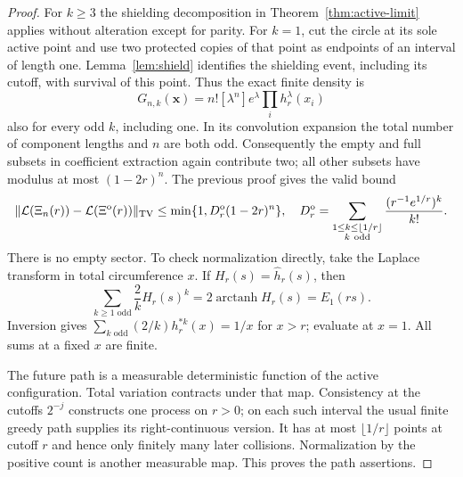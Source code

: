 \documentclass[11pt,letterpaper]{article}
\begin{document}
\begin{proof}
For $k\ge3$ the shielding decomposition in
Theorem~\ref{thm:active-limit} applies without alteration except for
parity. For $k=1$, cut the circle at its sole active point and use two
protected copies of that point as endpoints of an interval of length one.
Lemma~\ref{lem:shield} identifies the shielding event, including its
cutoff, with survival of this point. Thus the exact finite density is
\[
 G_{n,k}(\mathbf x)=n![\lambda^n]e^\lambda
                         \prod_i h_r^\lambda(x_i)
\]
also for every odd $k$, including one. In its convolution expansion the
total number of component lengths and $n$ are both odd. Consequently
the empty and full subsets in coefficient extraction again contribute
two; all other subsets have modulus at most $(1-2r)^n$.
The previous proof gives the valid bound
\begin{equation}\label{eq:odd-TV}
 \|\mathcal L(\Xi_n(r))-\mathcal L(\Xi^{\rm o}(r))\|_{\rm TV}
 \le\min\{1,D_r^{\rm o}(1-2r)^n\},\quad
 D_r^{\rm o}=\sum_{\substack{1\le k\le\lfloor1/r\rfloor\\k\ {\rm odd}}}
                  \frac{(r^{-1}e^{1/r})^k}{k!}.
\end{equation}
There is no empty sector. To check normalization directly, take the
Laplace transform in total circumference $x$. If $H_r(s)=\widehat h_r(s)$,
then
\[
 \sum_{k\ge1\text{ odd}}\frac2k H_r(s)^k
 =2\operatorname{arctanh}H_r(s)=E_1(rs).
\]
Inversion gives $\sum_{k\text{ odd}}(2/k)h_r^{*k}(x)=1/x$ for $x>r$;
evaluate at $x=1$. All sums at a fixed $x$ are finite.

The future path is a measurable deterministic function of the active
configuration. Total variation contracts under that map. Consistency at
the cutoffs $2^{-j}$ constructs one process on $r>0$; on each such
interval the usual finite greedy path supplies its right-continuous
version. It has at most $\lfloor1/r\rfloor$ points at cutoff $r$ and hence
only finitely many later collisions. Normalization by the positive count
is another measurable map. This proves the path assertions.
\end{proof}
\end{document}
